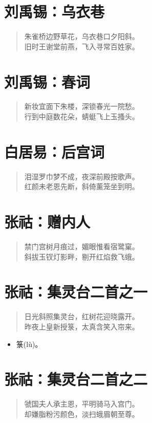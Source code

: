 \documentclass[12pt,oneside]{book}
\newenvironment{shici}{%
\begin{verse}\centering\yanti\large\hspace{12pt}}{\end{verse}}
\begin{document}
\begin{common-format}
\chapter{刘禹锡：乌衣巷}
\begin{shici}
朱雀桥边野草花，乌衣巷口夕阳斜。\\
旧时王谢堂前燕，飞入寻常百姓家。
\end{shici}

\chapter{刘禹锡：春词}
\begin{shici}
新妆宜面下朱楼，深锁春光一院愁。\\
行到中庭数花朵，蜻蜓飞上玉搔头。
\end{shici}

\chapter{白居易：后宫词}
\begin{shici}
泪湿罗巾梦不成，夜深前殿按歌声。\\
红颜未老恩先断，斜倚薰笼坐到明。
\end{shici}

\chapter{张祜：赠内人}
\begin{shici}
禁门宫树月痕过，媚眼惟看宿鹭窠。\\
斜拔玉钗灯影畔，剔开红焰救飞蛾。
\end{shici}

\chapter{张祜：集灵台二首之一}
\begin{shici}
日光斜照集灵台，红树花迎晓露开。\\
昨夜上皇新授箓，太真含笑入帘来。
\end{shici}

\begin{itemize}
\item 箓(lù)。
\end{itemize}

\chapter{张祜：集灵台二首之二}
\begin{shici}
虢国夫人承主恩，平明骑马入宫门。\\
却嫌脂粉污颜色，淡扫蛾眉朝至尊。
\end{shici}


\end{common-format}
\end{document}
